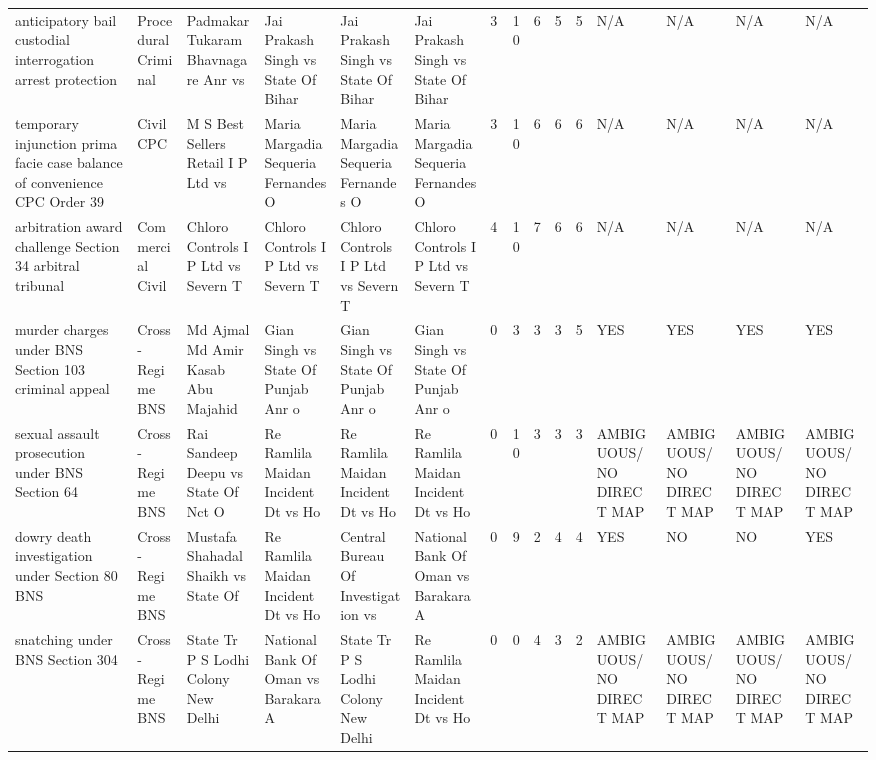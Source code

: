 \begin{table}
\begin{tabular}{llllllrrrrrllll}
anticipatory bail custodial interrogation arrest protection & Procedural Criminal & Padmakar Tukaram Bhavnagare Anr vs  & Jai Prakash Singh vs State Of Bihar & Jai Prakash Singh vs State Of Bihar & Jai Prakash Singh vs State Of Bihar & 3 & 10 & 6 & 5 & 5 & N/A & N/A & N/A & N/A \\
temporary injunction prima facie case balance of convenience CPC Order 39 & Civil CPC & M S Best Sellers Retail I P Ltd vs  & Maria Margadia Sequeria Fernandes O & Maria Margadia Sequeria Fernandes O & Maria Margadia Sequeria Fernandes O & 3 & 10 & 6 & 6 & 6 & N/A & N/A & N/A & N/A \\
arbitration award challenge Section 34 arbitral tribunal & Commercial Civil & Chloro Controls I P Ltd vs Severn T & Chloro Controls I P Ltd vs Severn T & Chloro Controls I P Ltd vs Severn T & Chloro Controls I P Ltd vs Severn T & 4 & 10 & 7 & 6 & 6 & N/A & N/A & N/A & N/A \\
murder charges under BNS Section 103 criminal appeal & Cross-Regime BNS & Md Ajmal Md Amir Kasab Abu Majahid  & Gian Singh vs State Of Punjab Anr o & Gian Singh vs State Of Punjab Anr o & Gian Singh vs State Of Punjab Anr o & 0 & 3 & 3 & 3 & 5 & YES & YES & YES & YES \\
sexual assault prosecution under BNS Section 64 & Cross-Regime BNS & Rai Sandeep Deepu vs State Of Nct O & Re Ramlila Maidan Incident Dt vs Ho & Re Ramlila Maidan Incident Dt vs Ho & Re Ramlila Maidan Incident Dt vs Ho & 0 & 10 & 3 & 3 & 3 & AMBIGUOUS/NO DIRECT MAP & AMBIGUOUS/NO DIRECT MAP & AMBIGUOUS/NO DIRECT MAP & AMBIGUOUS/NO DIRECT MAP \\
dowry death investigation under Section 80 BNS & Cross-Regime BNS & Mustafa Shahadal Shaikh vs State Of & Re Ramlila Maidan Incident Dt vs Ho & Central Bureau Of Investigation vs  & National Bank Of Oman vs Barakara A & 0 & 9 & 2 & 4 & 4 & YES & NO & NO & YES \\
snatching under BNS Section 304 & Cross-Regime BNS & State Tr P S Lodhi Colony New Delhi & National Bank Of Oman vs Barakara A & State Tr P S Lodhi Colony New Delhi & Re Ramlila Maidan Incident Dt vs Ho & 0 & 0 & 4 & 3 & 2 & AMBIGUOUS/NO DIRECT MAP & AMBIGUOUS/NO DIRECT MAP & AMBIGUOUS/NO DIRECT MAP & AMBIGUOUS/NO DIRECT MAP \\
\bottomrule
\end{tabular}
\end{table}
